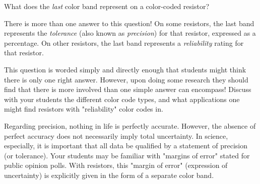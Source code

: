 

What does the {\it last} color band represent on a color-coded resistor?







There is more than one answer to this question!  On some resistors, the last band represents the {\it tolerance} (also known as {\it precision}) for that resistor, expressed as a percentage.  On other resistors, the last band represents a {\it reliability} rating for that resistor.







This question is worded simply and directly enough that students might think there is only one right answer.  However, upon doing some research they should find that there is more involved than one simple answer can encompass!  Discuss with your students the different color code types, and what applications one might find resistors with "reliability" color codes in.

Regarding precision, nothing in life is perfectly accurate.  However, the absence of perfect accuracy does not necessarily imply total uncertainty.  In science, especially, it is important that all data be qualified by a statement of precision (or tolerance).  Your students may be familiar with "margins of error" stated for public opinion polls.  With resistors, this "margin of error" (expression of uncertainty) is explicitly given in the form of a separate color band.




